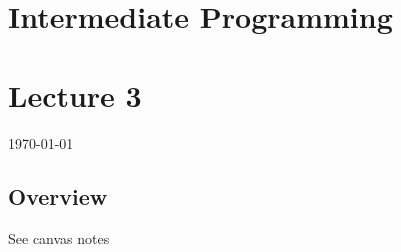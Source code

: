 \documentclass[12pt]{article}
\begin{document}
{\centering
\section*{Intermediate Programming}
\section*{Lecture 3}
\indent\today
}
\subsection*{Overview}
See canvas notes
\end{document}
